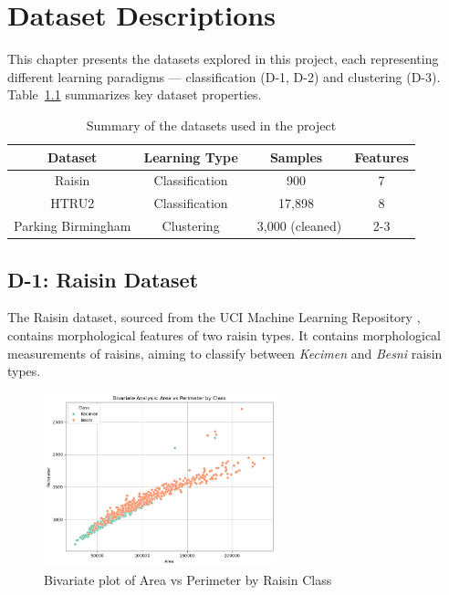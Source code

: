 \chapter{Dataset Descriptions}
\label{ch:data_description}

This chapter presents the datasets explored in this project, each representing different learning paradigms — classification (D-1, D-2) and clustering (D-3). Table~\ref{tab:dataset_summary} summarizes key dataset properties.

\begin{table}[H]
    \centering
    \caption{Summary of the datasets used in the project}
    \label{tab:dataset_summary}
    \begin{tabular}{|c|c|c|c|}
        \hline
        \textbf{Dataset} & \textbf{Learning Type} & \textbf{Samples} & \textbf{Features} \\
        \hline
        Raisin           & Classification        & 900              & 7                 \\
        HTRU2            & Classification        & 17,898           & 8                 \\
        Parking Birmingham & Clustering           & ~3,000 (cleaned) & 2-3               \\
        \hline
    \end{tabular}
\end{table}

\section{D-1: Raisin Dataset}
\label{sec:dataset_raisin}

The Raisin dataset, sourced from the UCI Machine Learning Repository \cite{raisin_dataset}, contains morphological features of two raisin types.
It contains morphological measurements of raisins, aiming to classify between \textit{Kecimen} and \textit{Besni} raisin types.

\begin{figure}[H]
    \centering
    \includegraphics[width=0.6\textwidth]{figures/raisin_scatter.png}
    \caption{Bivariate plot of Area vs Perimeter by Raisin Class}
    \label{fig:raisin_scatter}
\end{figure}

